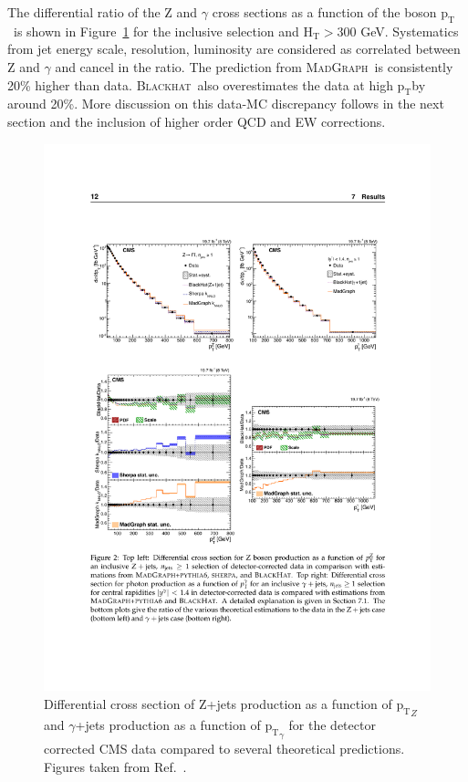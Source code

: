\documentclass[a4paper,11pt,notoc]{article}
\newcommand{\pt}{\ensuremath{\mathrm{p_T}}}
\newcommand{\Ht}{\ensuremath{\mathrm{H_T}}}
\newcommand{\BLACKHAT}{\textsc{Blackhat}}
\newcommand{\MADGRAPH}{\textsc{MadGraph}}
\begin{document}
The differential ratio of the Z and $\gamma$ cross sections as a function of the boson \pt\ is shown in Figure~\ref{fig:ptZgamma-CMS} for the inclusive selection and $\Ht > 300$ GeV. Systematics from jet energy scale, resolution, luminosity are considered as correlated between Z and $\gamma$ and cancel in the ratio. The prediction from \MADGRAPH\ is consistently 20\% higher than data. \BLACKHAT\ also overestimates the data at high \pt by around 20\%. More discussion on this data-MC discrepancy follows in the next section and the inclusion of higher order QCD and EW corrections. 

\begin{figure}[t!]
\centering
\includegraphics[width=0.9\columnwidth]{ptZ-ptgamma-CMS.pdf} 
\caption{Differential cross section of Z+jets production as a function of $\pt_{Z}$ and $\gamma$+jets production as a function of $\pt_{\gamma}$ for the detector corrected CMS data compared to several theoretical predictions. Figures taken from Ref.~\cite{Khachatryan:2015ira}.}
\label{fig:ptZgamma-CMS}
\end{figure}   
\end{document}
